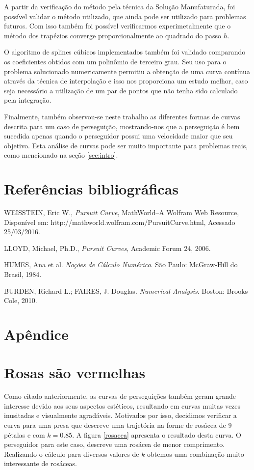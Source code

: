 \documentclass[a4paper,10pt]{article}
\begin{document}
  A partir da verificação do método pela técnica da Solução Manufaturada, foi possível validar o método utilizado, que ainda pode ser utilizado para problemas futuros. Com isso também foi possível verificarmos experimetalmente que o método dos trapézios converge proporcionalmente ao quadrado do passo $h$.
  
  O algoritmo de splines cúbicos implementados também foi validado comparando os coeficientes obtidos com um polinômio de terceiro grau. Seu uso para o problema solucionado numericamente permitiu a obtenção de uma curva contínua através da técnica de interpolação e isso nos proporciona um estudo melhor, caso seja necessário a utilização de um par de pontos que não tenha sido calculado pela integração.
  
  Finalmente, também observou-se neste trabalho as diferentes formas de curvas descrita para um caso de perseguição, mostrando-nos que a perseguição é bem sucedida apenas quando o perseguidor possui uma velocidade maior que seu objetivo. Esta análise de curvas pode ser muito importante para problemas reais, como mencionado na seção \ref{sec:intro}.
  
  \section{Referências bibliográficas}
  

  \begin{thebibliography}{9}
      WEISSTEIN, Eric W.,
      \emph{Pursuit Curve},
      MathWorld--A Wolfram Web Resource,
      Disponível em: http://mathworld.wolfram.com/PursuitCurve.html,
      Acessado 25/03/2016.

      LLOYD, Michael, Ph.D.,
      \emph{Pursuit Curves},
      Academic Forum 24,
      2006.
      
      HUMES, Ana et al. \emph{Noções de Cálculo Numérico}. São Paulo: McGraw-Hill do Brasil, 1984.
     
      BURDEN, Richard L.; FAIRES, J. Douglas. \emph{Numerical Analysis}. Boston: Brooks Cole, 2010.  

  \end{thebibliography}
  
  \section{Apêndice}
  \appendix
  \section{Rosas são vermelhas}
  Como citado anteriormente, as curvas de perseguições também geram grande interesse devido aos seus aspectos estéticos, resultando em curvas muitas vezes inusitadas e visualmente agradáveis.
  Motivados por isso, decidimos verificar a curva para uma presa que descreve uma trajetória na forme de rosácea de 9 pétalas e com $k = 0.85$. A figura \ref{rosacea} apresenta o resultado desta curva. O perseguidor para este caso, descreve uma rosácea de menor comprimento. Realizando o cálculo para diversos valores de $k$ obtemos uma combinação muito interessante de rosáceas.
  
\end{document}
